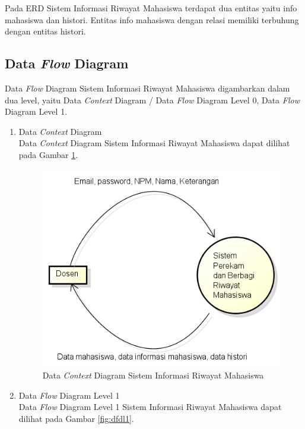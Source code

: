 Pada ERD Sistem Informasi Riwayat Mahasiswa terdapat dua entitas yaitu info
mahasiswa dan histori. Entitas info mahasiswa dengan relasi memiliki terbuhung
dengan entitas histori.

\subsection{Data {\it Flow} Diagram}
Data {\it Flow} Diagram Sistem Informasi Riwayat Mahasiswa digambarkan dalam dua
level, yaitu Data {\it Context} Diagram / Data {\it Flow} Diagram Level 0, Data
{\it Flow} Diagram Level 1.

\begin{enumerate}[(1)]
  \item Data {\it Context} Diagram\\
  Data {\it Context} Diagram Sistem Informasi Riwayat Mahasiswa dapat dilihat pada
  Gambar \ref{fig:dcd}.
  
\begin{figure}[p]
\centering
\includegraphics[scale=1]{Gambar/datacontextdiagram.png}
\caption[Data {\it Context} Diagram Sistem Informasi Riwayat Mahasiswa]{Data
{\it Context} Diagram Sistem Informasi Riwayat Mahasiswa}
\label{fig:dcd}
\end{figure}
  
  \item Data {\it Flow} Diagram Level 1\\
  Data {\it Flow} Diagram Level 1 Sistem Informasi Riwayat Mahasiswa dapat dilihat
  pada Gambar \ref{fig:dfdl1}.
  

\end{enumerate}
